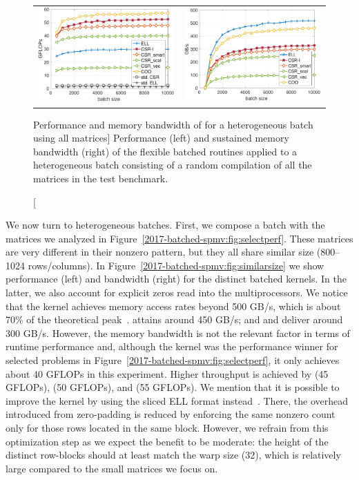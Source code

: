 \begin{figure}[t]
\begin{center}
\begin{tabular}{cc}
\includegraphics[width=.45\columnwidth]{plots/RND_GFLOPS}
&
\includegraphics[width=.45\columnwidth]{plots/RND_BW}\\
\end{tabular}
\end{center}
\caption
[Performance and memory bandwidth of \spmv for a heterogeneous batch using all
matrices]
{Performance (left) and sustained memory bandwidth (right) of the 
flexible batched \spmv routines
applied to a heterogeneous batch consisting of a random compilation of all the 
matrices in the test benchmark.
}
\label{2017-batched-spmv:fig:allsize}
\end{figure}



We now turn to heterogeneous batches. First, we compose a batch with the 
matrices
we analyzed in Figure~\ref{2017-batched-spmv:fig:selectperf}. These matrices are very different 
in their nonzero pattern, 
but they all share similar size (800--1024 rows/columns).
In Figure~\ref{2017-batched-spmv:fig:similarsize} we show performance (left) and bandwidth 
(right) for the distinct 
batched \spmv kernels. In the latter, we also account for explicit zeros read 
into the multiprocessors.
We notice that the \ell kernel achieves memory access rates beyond 500 GB/s, 
which is about 70\% of the theoretical peak~\cite{P100}. 
\coo attains around 450 GB/s; and \csrsmart and \csri deliver around 300 GB/s.
However, the memory bandwidth is not the relevant factor in terms of 
runtime performance and, although the \ell kernel was the performance
winner for selected problems in Figure~\ref{2017-batched-spmv:fig:selectperf},
it only achieves about 40 GFLOPs in this experiment.
Higher throughput is achieved by \csrsmart (45 GFLOPs), \csri (50 GFLOPs),
and \coo (55 GFLOPs).
We mention that it is possible to improve the \ell kernel by 
using the sliced ELL format instead~\cite{sellpreport}.
There, the overhead introduced from zero-padding is reduced
by enforcing the same nonzero count only for those rows located in the same 
block.
However, we refrain from this optimization step as we expect the benefit to be 
moderate:
the height of the distinct row-blocks should at least match the warp size (32), 
which is relatively large compared to the small matrices we focus on.

